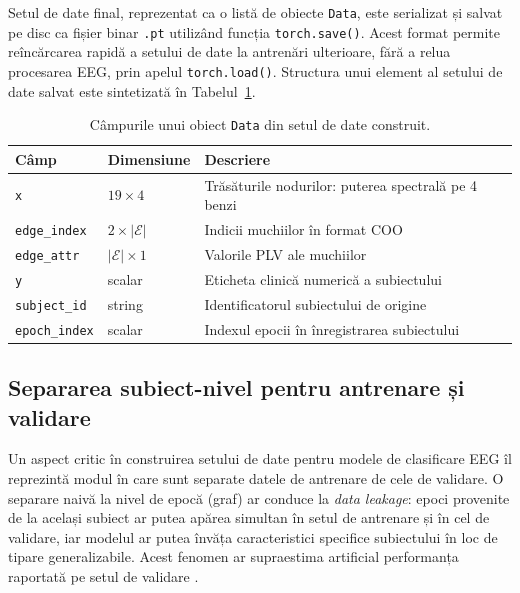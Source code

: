 \documentclass[12pt,a4paper]{report}
\theoremstyle{definition}
\theoremstyle{remark}
\begin{document}
Setul de date final, reprezentat ca o listă de obiecte \texttt{Data}, este serializat și salvat pe disc ca fișier binar \texttt{.pt} utilizând funcția \texttt{torch.save()}. Acest format permite reîncărcarea rapidă a setului de date la antrenări ulterioare, fără a relua procesarea EEG, prin apelul \texttt{torch.load()}. Structura unui element al setului de date salvat este sintetizată în Tabelul~\ref{tab:data_object}.

\begin{table}[H]
    \centering
    \caption{Câmpurile unui obiect \texttt{Data} din setul de date construit.}
    \label{tab:data_object}
    \begin{tabular}{|l|l|p{6.5cm}|}
        \hline
        \textbf{Câmp} & \textbf{Dimensiune} & \textbf{Descriere} \\
        \hline
        \texttt{x} & $19 \times 4$ & Trăsăturile nodurilor: puterea spectrală pe 4 benzi \\
        \hline
        \texttt{edge\_index} & $2 \times |\mathcal{E}|$ & Indicii muchiilor în format COO \\
        \hline
        \texttt{edge\_attr} & $|\mathcal{E}| \times 1$ & Valorile PLV ale muchiilor \\
        \hline
        \texttt{y} & scalar & Eticheta clinică numerică a subiectului \\
        \hline
        \texttt{subject\_id} & string & Identificatorul subiectului de origine \\
        \hline
        \texttt{epoch\_index} & scalar & Indexul epocii în înregistrarea subiectului \\
        \hline
    \end{tabular}
\end{table}

\subsection{Separarea subiect-nivel pentru antrenare și validare}

Un aspect critic în construirea setului de date pentru modele de clasificare EEG îl reprezintă modul în care sunt separate datele de antrenare de cele de validare. O separare naivă la nivel de epocă (graf) ar conduce la \textit{data leakage}: epoci provenite de la același subiect ar putea apărea simultan în setul de antrenare și în cel de validare, iar modelul ar putea învăța caracteristici specifice subiectului în loc de tipare generalizabile. Acest fenomen ar supraestima artificial performanța raportată pe setul de validare \cite{klepl2023gnn}.
\end{document}

